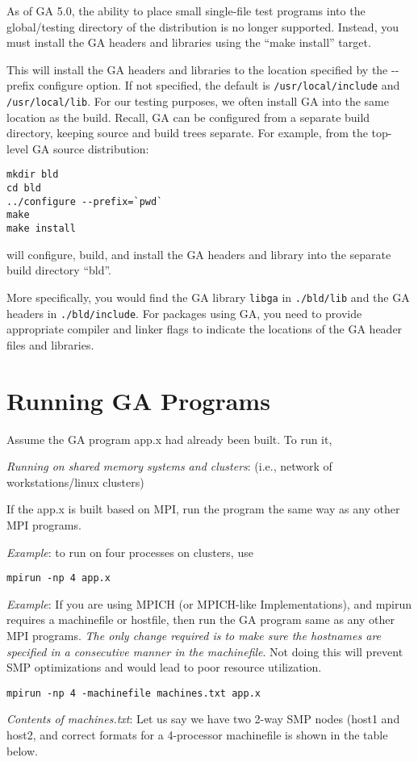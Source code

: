 As of GA 5.0, the ability to place small single-file test programs into the
global/testing directory of the distribution is no longer supported. Instead,
you must install the GA headers and libraries using the ``make install''
target.

This will install the GA headers and libraries to the location specified by the
-{}-prefix configure option. If not specified, the default is
\texttt{/usr/local/include} and \texttt{/usr/local/lib}.  For our testing
purposes, we often install GA into the same location as the build. Recall, GA
can be configured from a separate build directory, keeping source and build
trees separate. For example, from the top-level GA source distribution: 
\begin{verbatim}
mkdir bld
cd bld
../configure --prefix=`pwd`
make
make install
\end{verbatim}
will configure, build, and install the GA headers and library into the separate
build directory ``bld''.

More specifically, you would find the GA library \texttt{libga} in
\texttt{./bld/lib} and the GA headers in \texttt{./bld/include}. For packages
using GA, you need to provide appropriate compiler and linker flags to indicate
the locations of the GA header files and libraries. 

\section{Running GA Programs}

Assume the GA program app.x had already been built. To run it,

\emph{Running on shared memory systems and clusters}: (i.e., network of
workstations/linux clusters)

If the app.x is built based on MPI, run the program the same way as any other
MPI programs. 

\emph{Example}: to run on four processes on clusters, use 
\begin{verbatim}
mpirun -np 4 app.x
\end{verbatim}
\emph{Example}: If you are using MPICH (or MPICH-like Implementations), and
mpirun requires a machinefile or hostfile, then run the GA program same as any
other MPI programs. \textit{The only change required is to make sure the
hostnames are specified in a consecutive manner in the machinefile}. Not doing
this will prevent SMP optimizations and would lead to poor resource
utilization.
\begin{verbatim}
mpirun -np 4 -machinefile machines.txt app.x
\end{verbatim}
\emph{Contents of machines.txt}: Let us say we have two 2-way SMP
nodes (host1 and host2, and correct formats for a 4-processor machinefile
is shown in the table below.

